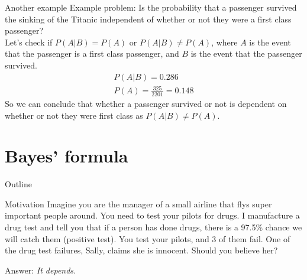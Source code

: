 \documentclass[xcolor=dvipsnames]{beamer}
\begin{document}
\begin{frame}{Another example}
	Example problem: Is the probability that a passenger survived the sinking of the Titanic independent of whether or not they were a first class passenger? \\
	Let's check if $P(A|B) = P(A)$ or $P(A|B) \neq P(A)$, where $A$ is the event that the passenger is a first class passenger, and $B$ is the event that the passenger survived.
	\begin{gather*}
		P(A|B) = 0.286 \\
		P(A) = \frac{325}{2201} = 0.148
	\end{gather*}
	So we can conclude that whether a passenger survived or not is dependent on whether or not they were first class as $P(A|B) \neq P(A)$.
\end{frame}

\section{Bayes' formula}
\begin{frame}{Outline}
\tableofcontents[currentsection,subsectionstyle=show/shaded/hide]
\end{frame}

\begin{frame}{Motivation}
Imagine you are the manager of a small airline that flys super important people around. You need to test your pilots for drugs. I manufacture a drug test and tell you that if a person has done drugs, there is a 97.5\% chance we will catch them (positive test). You test your pilots, and 3 of them fail. One of the drug test failures, Sally, claims she is innocent. Should you believe her? 

\vspace{10pt}
Answer: \emph{It depends.}

\end{frame}
\end{document}
